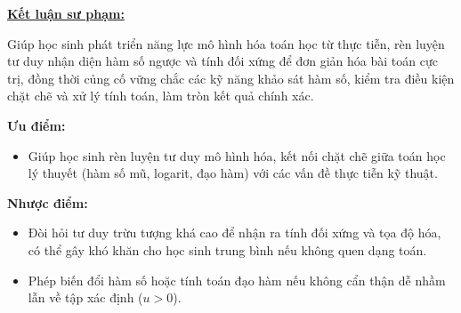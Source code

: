 \documentclass[12pt,a4paper,oneside]{book}
\theoremstyle{theorem}
\theoremstyle{definition}
\begin{document}
        \textbf{\underline{Kết luận sư phạm:}}

        Giúp học sinh phát triển năng lực mô hình hóa toán học từ thực tiễn, rèn luyện tư duy nhận diện hàm số ngược và tính đối xứng để đơn giản hóa bài toán cực trị, đồng thời củng cố vững chắc các kỹ năng khảo sát hàm số, kiểm tra điều kiện chặt chẽ và xử lý tính toán, làm tròn kết quả chính xác.
        
        \textbf{Ưu điểm:}
        \begin{itemize}
            \item Giúp học sinh rèn luyện tư duy mô hình hóa, kết nối chặt chẽ giữa toán học lý thuyết (hàm số mũ, logarit, đạo hàm) với các vấn đề thực tiễn kỹ thuật.
        \end{itemize}
        
        \textbf{Nhược điểm:}
        \begin{itemize}
            \item Đòi hỏi tư duy trừu tượng khá cao để nhận ra tính đối xứng và tọa độ hóa, có thể gây khó khăn cho học sinh trung bình nếu không quen dạng toán.
            \item Phép biến đổi hàm số hoặc tính toán đạo hàm nếu không cẩn thận dễ nhầm lẫn về tập xác định ($u > 0$).
        \end{itemize}

       
    
\end{document}
